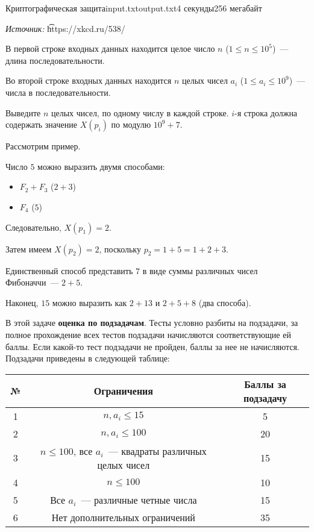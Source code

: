 \begin{problem}{Криптографическая защита}{input.txt}{output.txt}{4 секунды}{256 мегабайт}
\begin{center}
	\scriptsize \textit{Источник:} \t{https://xkcd.ru/538/}
\end{center}

\InputFile

В первой строке входных данных находится целое число $n$ ($1 \le n \le 10^5$)~--- длина последовательности.

Во второй строке входных данных находится $n$ целых чисел $a_i$ ($1 \le a_i \le 10^9$)~--- числа в последовательности.

\OutputFile

Выведите $n$ целых чисел, по одному числу в каждой строке. $i$-я строка должна содержать значение $X(p_i)$ по модулю $10^9 + 7$.

\Examples

\begin{example}
%
\end{example}

\Notes

Рассмотрим пример.

Число $5$ можно выразить двумя способами:

\begin{itemize}
\item $F_2 + F_3$ ($2 + 3$)
\item $F_4$ ($5$)
\end{itemize}

Следовательно, $X(p_1) = 2$.

Затем имеем $X(p_2) = 2$, поскольку $p_2 = 1 + 5 = 1 + 2 + 3$.

Единственный способ представить $7$ в виде суммы различных чисел Фибоначчи~--- $2 + 5$.

Наконец, $15$ можно выразить как $2 + 13$ и $2 + 5 + 8$ (два способа).

\Scoring

В этой задаче \textbf{оценка по подзадачам}. Тесты условно разбиты на подзадачи, за полное прохождение всех тестов подзадачи начисляются соответствующие ей баллы. Если какой-то тест подзадачи не пройден, баллы за нее не начисляются. Подзадачи приведены в следующей таблице:

\medskip

\begin{tabular}{| c | c | c |} \hline
	№ & Ограничения & Баллы за подзадачу \\ \hline
	1 & $n, a_i \le 15$ & 5 \\ \hline
	2 & $n, a_i \le 100$ & 20 \\ \hline
	3 & $n \le 100$, все $a_i$~--- квадраты различных целых чисел & 15 \\ \hline
	4 & $n \le 100$ & 10 \\ \hline
	5 & Все $a_i$~--- различные четные числа & 15 \\ \hline
	6 & Нет дополнительных ограничений & 35 \\ \hline
\end{tabular}

\end{problem}

